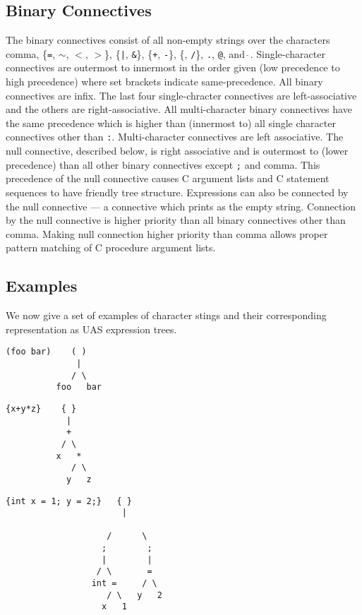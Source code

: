\documentclass{article}
\newcommand{\mtt}[1]{\mbox{\tt #1}}
\begin{document}
\subsection{Binary Connectives}

The binary connectives consist of all non-empty strings over the characters comma, \{{\tt =}, {\tt $\sim$}, {\tt $<$}, {\tt $>$}\}, \{\mtt{|}, {\tt \&}\}, \{{\tt +},
{\tt -}\}, \{{\tt *}, {\tt /}\}, {\tt .}, {\tt @}, and \mtt{$\hat{~}$}.
Single-character connectives are outermost to innermost in the order given (low
precedence to high precedence) where set brackets indicate same-precedence.    All binary connectives are infix.  The last four single-chracter connectives are left-associative and the
others are right-associative.
All multi-character binary connectives have the same
precedence which is higher than (innermost to) all single character connectives other than {\tt :}.
Multi-character connectives are left associative.  The null connective, described below, is right associative and is outermost to (lower precedence) than all other binary connectives
except {\tt;} and comma.  This precedence of the null connective causes C argument lists and C statement sequences to have friendly tree structure.
Expressions can also be connected by the null connective --- a connective which prints as the empty string.  Connection by the null connective is higher priority than all binary connectives other than comma.
Making null connection higher priority than comma allows proper pattern matching of C procedure argument lists.

\subsection{Examples}
We now give a set of examples of character stings and their corresponding representation as UAS expression trees.

\begin{verbatim}
(foo bar)    ( )
              |
             / \
          foo   bar
\end{verbatim}

\begin{verbatim}
{x+y*z}    { }
            |
            +
           / \
          x   *
             / \
            y   z
\end{verbatim}

\begin{verbatim}
{int x = 1; y = 2;}   { }
                       |
 
                    /      \
                   ;        ;
                   |        |
                  / \       =
                 int =     / \
                    / \   y   2
                   x   1
\end{verbatim}
\end{document}
